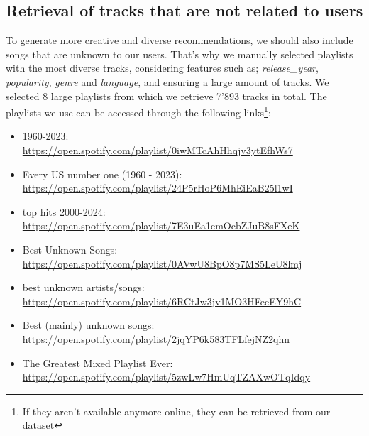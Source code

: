 \subsection{Retrieval of tracks that are not related to users} \label{subsection:spotify_tracks}
To generate more creative and diverse recommendations, we should also include songs that are unknown to our users. That's why we manually selected playlists with the most diverse tracks, considering features such as; \textit{release\_year}, \textit{popularity}, \textit{genre} and \textit{language}, and ensuring a large amount of tracks. We selected 8 large playlists from which we retrieve 7'893 tracks in total. The playlists we use can be accessed through the following links\footnote{If they aren't available anymore online, they can be retrieved from our dataset}:
\begin{itemize}
    \item 1960-2023:\\ \url{https://open.spotify.com/playlist/0iwMTcAhHhqjv3ytEfhWs7}
    
    \item Every US number one (1960 - 2023):\\
    \url{https://open.spotify.com/playlist/24P5rHoP6MhEiEaB25l1wI}

    \item top hits 2000-2024:\\
    \url{https://open.spotify.com/playlist/7E3uEa1emOcbZJuB8sFXeK}

    \item Best Unknown Songs:\\
    \url{https://open.spotify.com/playlist/0AVwU8BpO8p7MS5LeU8lmj}
    
    \item best unknown artists/songs:\\
    \url{https://open.spotify.com/playlist/6RCtJw3jv1MO3HFeeEY9hC}
    
    \item Best (mainly) unknown songs:\\
    \url{https://open.spotify.com/playlist/2jqYP6k583TFLfejNZ2qhn}
    
    \item The Greatest Mixed Playlist Ever:\\
    \url{https://open.spotify.com/playlist/5zwLw7HmUqTZAXwOTqIdqy}
\end{itemize}

